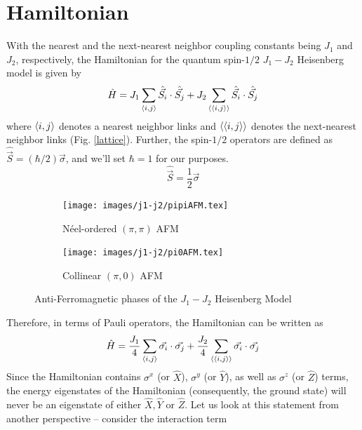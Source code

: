 \documentclass[../thesis_main.tex]{subfiles}
\begin{document}
\section{Hamiltonian}
With the nearest and the next-nearest neighbor coupling constants being $J_1$ and $J_2$, respectively, the Hamiltonian for the quantum spin-$1/2$ $J_1 - J_2$ Heisenberg model is given by
\begin{equation}
    \hat{H} = J_1 \sum_{\expval{i, j}} \hat{\vec{S_i}} \cdot \hat{\vec{S_j}} + J_2 \sum_{\expval{\expval{i, j}}} \hat{\vec{S_i}} \cdot \hat{\vec{S_j}}
\end{equation} 
where $\expval{i, j}$ denotes a nearest neighbor links and $\expval{\expval{i,j}}$ denotes the next-nearest neighbor links (Fig. \ref{lattice}). Further, the spin-$1/2$ operators are defined as $\hat{\vec{S}} = (\hbar/2) \vec{\sigma}$, and we'll set $\hbar = 1$ for our purposes.\begin{equation}
    \hat{\vec{S}} = \frac{1}{2} \vec{\sigma}
\end{equation}
\begin{figure}[t!]
    \centering
    \begin{subfigure}[b]{0.3\textwidth}  %
        \centering
        \texttt{[image: images/j1-j2/pipiAFM.tex]}
        \caption{Néel-ordered $(\pi, \pi)$ AFM}
    \end{subfigure}
    \hspace{3em}  %
    \begin{subfigure}[b]{0.3\textwidth}
        \centering
        \texttt{[image: images/j1-j2/pi0AFM.tex]}
        \caption{Collinear $(\pi, 0)$ AFM}
    \end{subfigure}
    \caption{Anti-Ferromagnetic phases of the $J_1 - J_2$ Heisenberg Model}
    \label{AFM}
\end{figure}
Therefore, in terms of Pauli operators, the Hamiltonian can be written as 
\begin{equation}
    \hat{H} = \frac{J_1}{4} \sum_{\expval{i,j}} \vec{\sigma_i} \cdot \vec{\sigma_j} + \frac{J_2}{4} \sum_{\expval{\expval{i, j}}} \vec{\sigma_i} \cdot \vec{\sigma_j}
\end{equation}
Since the Hamiltonian contains $\sigma^x$ (or $\hat{X}$), $\sigma^y$ (or $\hat{Y}$), as well as $\sigma^z$ (or $\hat{Z}$) terms, the energy eigenstates of the Hamiltonian (consequently, the ground state) will never be an eigenstate of either $\hat{X}, \hat{Y}$ or $\hat{Z}$. Let us look at this statement from another perspective -- consider the interaction term 
\end{document}
